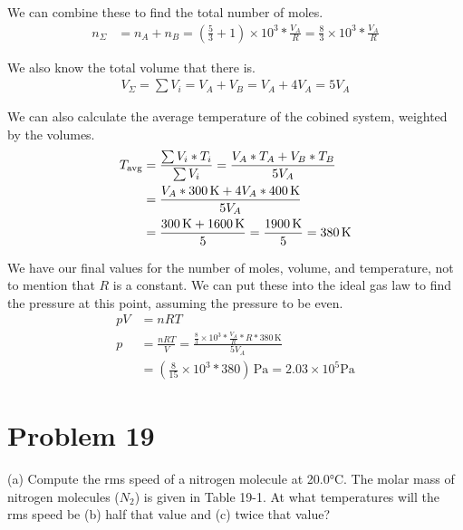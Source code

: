 \documentclass[12pt]{article}
\begin{document}
            We can combine these to find the total number of moles.
            \begin{align}
                n_{\Sigma}  &=  n_A + n_B
                    =   \left( \frac{5}{3} + 1 \right) \times 10^3 * \frac{V_A}{R}
                    =   \frac{8}{3} \times 10^3 * \frac{V_A}{R}
            \end{align}

            We also know the total volume that there is.
            \begin{gather}
                V_{\Sigma}  =   \sum V_i
                    =   V_A + V_B
                    =   V_A + 4V_A
                    =   5V_A
            \end{gather}

            We can also calculate the average temperature of the cobined system, weighted by the volumes.
            \begin{align}
                T_{\rm avg} &=  \frac{\sum V_i * T_i}{\sum V_i}
                    =   \frac{V_A * T_A + V_B * T_B}{5V_A}\\
                    &=  \frac{V_A * 300\,\unit{\kelvin} + 4 V_A * 400\,\unit{\kelvin}}{5V_A}\\
                    &=  \frac{300\,\unit{\kelvin} + 1600\,\unit{\kelvin}}{5}
                    =   \frac{1900\,\unit{\kelvin}}{5}
                    =   380\,\unit{\kelvin}
            \end{align}

            We have our final values for the number of moles, volume, and temperature, not to mention that $R$ is a constant.
            We can put these into the ideal gas law to find the pressure at this point, assuming the pressure to be even.
            \begin{align}
                pV  &=  nRT\\
                p   &=  \frac{nRT}{V}
                    =   \frac{\frac{8}{3} \times 10^3 * \frac{V_A}{R} * R * 380\,\unit{\kelvin}}{5V_A}\\
                    &=  \left( \frac{8}{15} \times 10^3 * 380 \right)\,\unit{\pascal}
                    =   \boxed{2.03 \times 10^5 \unit{\pascal}}
            \end{align}

    \pagebreak
    \section{Problem 19}
        (a) Compute the rms speed of a nitrogen molecule at 20.0\unit{\celsius}. 
        The molar mass of nitrogen molecules ($N_2$) is given in Table 19-1.
        At what temperatures will the rms speed be (b) half that value and (c) twice that value?
\end{document}
